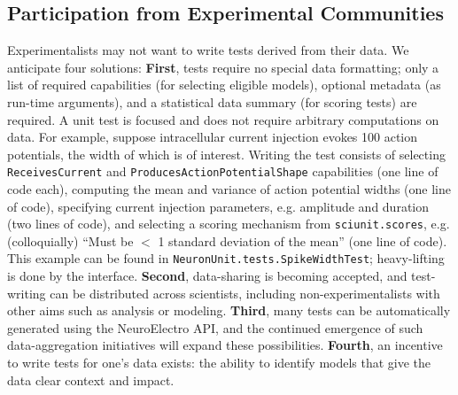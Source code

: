 \documentclass{frontiersSCNS}
\let\verbx\lstinline
\begin{document}
\subsection{Participation from Experimental Communities}
Experimentalists may not want to write tests derived from their data.  We anticipate four solutions: \textbf{First}, tests require no special data formatting; only a list of required  capabilities (for selecting eligible models), optional metadata (as run-time arguments), and a statistical data summary (for scoring tests) are required.  A unit test is focused and does not require arbitrary computations on data.  For example, suppose intracellular current injection evokes 100 action potentials, the width of which is of interest.  Writing the test consists of selecting \verbx{ReceivesCurrent} and \verbx{ProducesActionPotentialShape} capabilities (one line of code each), computing the mean and variance of action potential widths (one line of code), specifying current injection parameters, e.g. amplitude and duration (two lines of code), and selecting a scoring mechanism from \verbx{sciunit.scores}, e.g. (colloquially) ``Must be $<$ 1 standard deviation of the mean'' (one line of code).  This example can be found in \verbx{NeuronUnit.tests.SpikeWidthTest}; heavy-lifting is done by the interface.
\textbf{Second}, data-sharing is becoming accepted, and test-writing can be distributed across scientists, including non-experimentalists with other aims such as analysis or modeling. 
\textbf{Third}, many tests can be automatically generated using the NeuroElectro API, and the continued emergence of such data-aggregation initiatives will expand these possibilities. 
\textbf{Fourth}, an incentive to write tests for one's data exists: the ability to identify models that give the data clear context and impact. 
\end{document}
